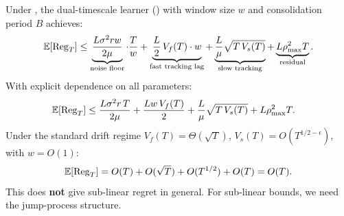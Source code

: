 \begin{theorem}
\label{thm:sufficiency-A}
Under , the dual-timescale learner
() with window size $w$ and consolidation
period $B$ achieves:
\[
  \mathbb{E}[\mathrm{Reg}_T] \leq
  \underbrace{\frac{L\sigma^2 r w}{2\mu}}_{\text{noise floor}} \cdot \frac{T}{w}
  + \underbrace{\frac{L}{2}\, V_f(T) \cdot w}_{\text{fast tracking lag}}
  + \underbrace{\frac{L}{\mu}\sqrt{T\, V_s(T)}}_{\text{slow tracking}}
  + \underbrace{L\rho_{\max}^2 T}_{\text{residual}}.
\]
With explicit dependence on all parameters:
\begin{align}
  \mathbb{E}[\mathrm{Reg}_T] &\leq
    \frac{L\sigma^2 r\, T}{2\mu}
    + \frac{Lw\, V_f(T)}{2}
    + \frac{L}{\mu}\sqrt{T\, V_s(T)}
    + L\rho_{\max}^2 T.
  \label{eq:thm2-versionA}
\end{align}
Under the standard drift regime $V_f(T) = \Theta(\sqrt{T})$,
$V_s(T) = O(T^{1/2-\epsilon})$, with $w = O(1)$:
\[
  \mathbb{E}[\mathrm{Reg}_T] = O(T) + O(\sqrt{T}) + O(T^{1/2}) + O(T)
  = O(T).
\]
This does \textbf{not} give sub-linear regret in general. For
sub-linear bounds, we need the jump-process structure.
\end{theorem}

